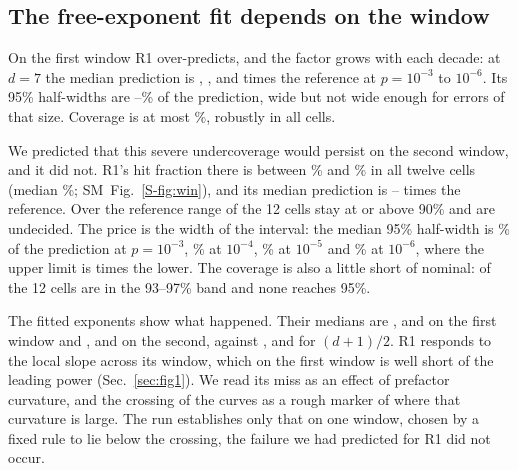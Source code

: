 \documentclass[aps,pre,twocolumn,superscriptaddress,nofootinbib,10pt]{revtex4-2}
\newcommand{\SM}{SM}
\begin{document}
\subsection{The free-exponent fit depends on the window}\label{sec:bw}
On the first window R1 over-predicts, and the factor grows with each decade: at $d=7$ the median prediction is , ,  and  times the reference at $p=10^{-3}$ to $10^{-6}$. Its 95\% half-widths are --\% of the prediction, wide but not wide enough for errors of that size. Coverage is at most \%, robustly in all  cells.

We predicted that this severe undercoverage would persist on the second window, and it did not. R1's hit fraction there is between \% and \% in all twelve cells (median \%; \SM\ Fig.~\ref{S-fig:win}), and its median prediction is -- times the reference. Over the reference range  of the 12 cells stay at or above 90\% and  are undecided. The price is the width of the interval: the median 95\% half-width is \% of the prediction at $p=10^{-3}$, \% at $10^{-4}$, \% at $10^{-5}$ and \% at $10^{-6}$, where the upper limit is  times the lower. The coverage is also a little short of nominal:  of the 12 cells are in the 93--97\% band and none reaches 95\%.

The fitted exponents show what happened. Their medians are ,  and  on the first window and ,  and  on the second, against ,  and  for $(d+1)/2$. R1 responds to the local slope across its window, which on the first window is well short of the leading power (Sec.~\ref{sec:fig1}). We read its miss as an effect of prefactor curvature, and the crossing of the curves as a rough marker of where that curvature is large. The run establishes only that on one window, chosen by a fixed rule to lie below the crossing, the failure we had predicted for R1 did not occur.
\end{document}
